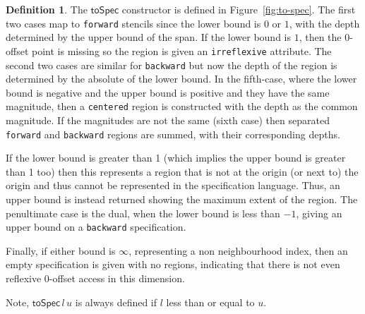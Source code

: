 \documentclass[9pt,preprint]{sigplanconf}
\newcounter{block}
\theoremstyle{definition}
\newtheorem{definition}[block]{Definition}
\begin{document}
\begin{definition} The $\mathsf{toSpec}$ constructor is defined
in Figure~\ref{fig:to-spec}.
The first two cases map to \texttt{forward} stencils since the lower
bound is $0$ or $1$, with the depth determined by the upper bound of
the span. If the lower bound is $1$, then the
$0$-offset point is missing so the region is given an
\texttt{irreflexive} attribute. The second two cases are similar for
\texttt{backward} but now the depth of the region is determined by the
absolute of the lower bound. In the fifth-case, where the lower bound
is negative and the upper bound is positive and they have the same
magnitude, then a \texttt{centered} region is constructed with
the depth as the common magnitude. If the magnitudes are not the same
(sixth case) then separated \texttt{forward} and \texttt{backward}
regions are summed, with their corresponding depths.

If the lower bound is greater than 1
(which implies the upper bound is greater than 1 too) then
this represents a region that is not at the origin (or next to) the
origin and thus cannot be represented in the specification language.
Thus, an upper bound is instead returned showing the maximum extent
of the region. The penultimate case is the dual, when the lower bound is less
than $-1$, giving an upper bound on a \texttt{backward} specification.

Finally, if either bound is $\infty$, representing a non
neighbourhood index, then an empty specification is given
 with no regions, indicating that there is not even reflexive
0-offset access in this dimension.

Note, $\mathsf{toSpec} \, l \, u$ is always defined 
 if $l$ less than or equal to $u$. 
\end{definition}
\end{document}
